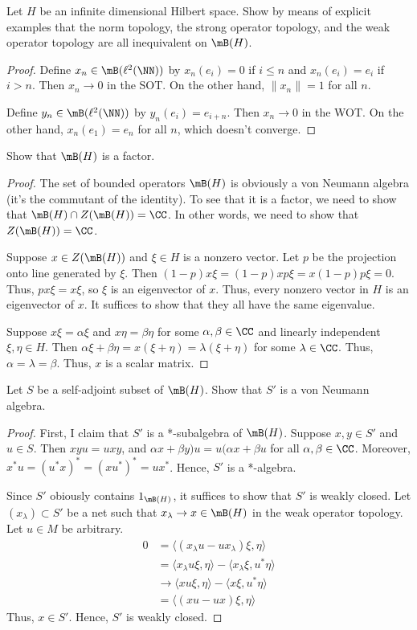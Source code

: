 \documentclass{article}
\begin{document}
 Let $H$ be an infinite dimensional Hilbert space. Show by means of explicit examples that the norm topology, the strong operator topology, and the weak operator topology are all inequivalent on $\mB(H)$.
\begin{proof}
  Define $x_n \in \mB(\ell^2(\NN))$  by $x_n(e_i) = 0$ if $i \le n$ and $x_n(e_i) = e_i$ if $i > n$. Then $x_n \to 0$ in the SOT. On the other hand, $\|x_n\| = 1$ for all $n$.

  Define $y_n \in \mB(\ell^2(\NN))$ by $y_n(e_i) = e_{i+n}$.  Then $x_n \to 0$ in the WOT.  On the other hand, $x_n(e_1) = e_n$ for all $n$, which doesn't converge.
\end{proof}

 Show that $\mB(H)$ is a factor.
\begin{proof}
  The set of bounded operators  $\mB(H)$ is obviously a von Neumann algebra (it's the commutant of the identity).  To see that it is a factor, we need to show that $\mB(H) \cap Z(\mB(H)) = \CC$.  In other words, we need to show that $Z(\mB(H)) = \CC$.

  Suppose $x \in Z(\mB(H))$ and $\xi \in H$ is a nonzero vector.  Let $p$ be the projection onto line generated by $\xi$.  Then $(1-p) x \xi = (1 - p) x p \xi = x (1 - p) p \xi = 0$.  Thus, $p x \xi = x \xi$, so $\xi$ is an eigenvector of $x$.  Thus, every nonzero vector in $H$ is an eigenvector of $x$.  It suffices to show that they all have the same eigenvalue.

  Suppose $x \xi = \alpha \xi$ and $x \eta = \beta \eta$ for some $\alpha, \beta \in \CC$ and linearly independent $\xi, \eta \in H$.  Then $\alpha \xi + \beta \eta = x (\xi + \eta) = \lambda (\xi + \eta)$ for some $\lambda \in \CC$.  Thus, $\alpha = \lambda = \beta$.  Thus, $x$ is a scalar matrix.
\end{proof}

 Let $S$ be a self-adjoint subset of $\mB(H)$. Show that $S'$ is a von Neumann algebra.
\begin{proof}
  First, I claim that $S'$ is a *-subalgebra of $\mB(H)$.  Suppose $x, y \in S'$ and $u \in S$.  Then $xyu = uxy$, and $\alpha x + \beta y) u = u (\alpha x + \beta u$ for all $\alpha, \beta \in \CC$.  Moreover,  $x^* u  = (u^* x)^* = (x u^*)^* = u x^*$.   Hence, $S'$ is a *-algebra.

  Since $S'$ obiously contains $1_{\mB(H)}$, it suffices to show that $S'$ is weakly closed.  Let $(x_\lambda) \subset S'$ be a net such that  $x_\lambda \to x \in \mB(H)$ in the weak operator topology.  Let $u \in M$ be arbitrary.  
  \begin{align*}
    0 & = \langle (x_\lambda u - u x_\lambda) \xi, \eta \rangle \\
    & = \langle x_\lambda u \xi, \eta \rangle - \langle x_\lambda \xi, u^* \eta \rangle \\
    & \to \langle x u \xi, \eta \rangle - \langle x \xi, u^* \eta \rangle \\
    & = \langle (x u - u x) \xi, \eta \rangle
  \end{align*}
  Thus, $x \in S'$.  Hence, $S'$ is weakly closed.
\end{proof}
\end{document}
